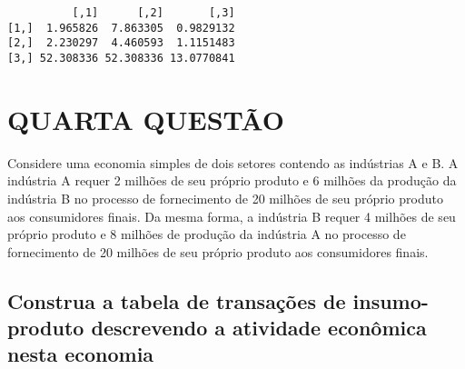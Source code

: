 \documentclass[
  letterpaper,
  DIV=11,
  numbers=noendperiod]{scrreprt}
\begin{document}
\begin{verbatim}
          [,1]      [,2]       [,3]
[1,]  1.965826  7.863305  0.9829132
[2,]  2.230297  4.460593  1.1151483
[3,] 52.308336 52.308336 13.0770841
\end{verbatim}

\chapter{QUARTA QUESTÃO}\label{quarta-questuxe3o}

Considere uma economia simples de dois setores contendo as indústrias A
e B. A indústria A requer 2 milhões de seu próprio produto e 6 milhões
da produção da indústria B no processo de fornecimento de 20 milhões de
seu próprio produto aos consumidores finais. Da mesma forma, a indústria
B requer 4 milhões de seu próprio produto e 8 milhões de produção da
indústria A no processo de fornecimento de 20 milhões de seu próprio
produto aos consumidores finais.

\section{Construa a tabela de transações de insumo-produto descrevendo a
atividade econômica nesta
economia}\label{construa-a-tabela-de-transauxe7uxf5es-de-insumo-produto-descrevendo-a-atividade-econuxf4mica-nesta-economia}
\end{document}
